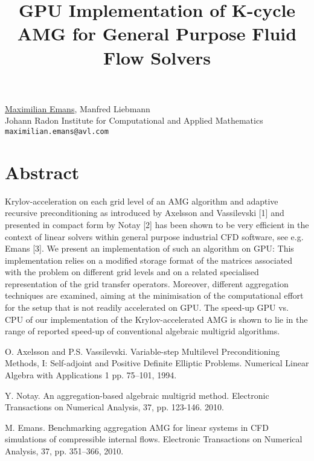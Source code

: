 \title{GPU Implementation of K-cycle AMG for General Purpose Fluid Flow Solvers}
 \author{} \institute{}
\maketitle
\begin{center}
{\large \underline{Maximilian Emans}, Manfred Liebmann}\\
Johann Radon Institute for Computational and Applied Mathematics\\
{\tt maximilian.emans@avl.com}

\end{center}

\section*{Abstract}

Krylov-acceleration on each grid level of an AMG algorithm and adaptive recursive preconditioning as introduced by Axelsson and Vassilevski [1] and presented in compact form by Notay [2] has been shown to be very efficient in the context of linear solvers within general purpose industrial CFD software, see e.g. Emans [3]. We present an implementation of such an algorithm on GPU: This implementation relies on a modified storage format of the matrices associated with the problem on different grid levels and on a related specialised representation of the grid transfer operators. Moreover, different aggregation techniques are examined, aiming at the minimisation of the computational effort for the setup that is not readily accelerated on GPU. The speed-up GPU vs. CPU of our implementation of the Krylov-accelerated AMG is shown to lie in the range of reported speed-up of conventional algebraic multigrid algorithms.


\begin{thebibliography}{10}

{\sc O. Axelsson and P.S. Vassilevski}. {Variable-step Multilevel Preconditioning Methods, {I}: Self-adjoint and Positive Definite Elliptic Problems}. Numerical Linear Algebra with Applications 1 pp. 75--101, 1994.



{\sc Y. Notay}. {An aggregation-based algebraic multigrid method}. Electronic Transactions on Numerical Analysis, 37, pp. 123-146. 2010.



{\sc M. Emans}. {Benchmarking aggregation {AMG} for linear systems in {CFD} simulations of compressible internal flows}. Electronic Transactions on Numerical Analysis, 37, pp. 351--366, 2010.

\end{thebibliography}
